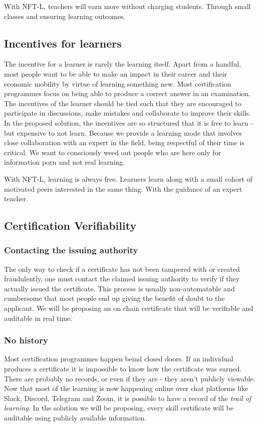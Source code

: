 \documentclass{article}
\begin{document}
       With NFT-L, teachers will earn more without charging students. Through small classes and ensuring learning outcomes.
     
       
    \subsection{Incentives for learners}
      The incentive for a learner is rarely the learning itself. Apart from a handful, most people want to be able to make an impact in their career and their economic mobility by virtue of learning something new. 
      Most certification programmes focus on being able to produce a correct answer in an examination. The incentives of the learner should be tied such that they are encouraged to participate in discussions, make mistakes and collaborate to improve their skills.
      \break
      In the proposed solution, the incentives are so structured that it is free to learn - but expensive to not learn. Because we provide a learning mode that involves close collaboration with an expert in the field, being respectful of their time is critical. 
      We want to consciously weed out people who are here only for information porn and not real learning.
      
      With NFT-L, learning is always free. Learners learn along with a small cohort of motivated peers interested in the same thing. With the guidance of an expert teacher.
    \subsection{Certification Verifiability}
      \subsubsection{Contacting the issuing authority}
        The only way to check if a certificate has not been tampered with or created fraudulently, one must contact the claimed issuing authority to verify if they actually issued the certificate. 
        This process is usually non-automatable and cumbersome that most people end up giving the benefit of doubt to the applicant. 
        \break
        We will be proposing an on chain certificate that will be verifiable and auditable in real time.
      \subsubsection{No history}
        Most certification programmes happen beind closed doors. If an individual produces a certificate it is impossible to know how the certificate was earned. There are probably no records, or even if they are - they aren't publicly viewable. 
        \break
        Now that most of the learning is now happening online over chat platforms like Slack, Discord, Telegram and Zoom, it is possible to have a record of the \textit{trail of learning}. In the solution we will be proposing, every skill certificate will be auditable using publicly available information.
\end{document}
